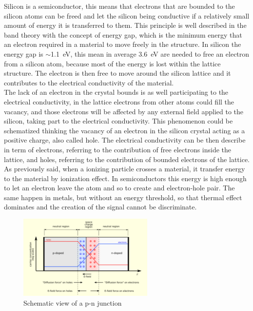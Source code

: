 Silicon is a semiconductor, this means that electrons that are bounded to the silicon atoms can be freed and let the silicon being conductive if a relatively small amount of energy it is transferred to them. This principle is well described in the band theory \cite{band-theory} with the concept of energy gap, which is the minimum energy that an electron required in a material to move freely in the structure. In silicon the energy gap is $\sim$\SI{1.1}{\eV}, this mean in average \SI{3.6}{\eV} are needed to free an electron from a silicon atom, because most of the energy is lost within the lattice structure. The electron is then free to move around the silicon lattice and it contributes to the electrical conductivity of the material.\\
The lack of an electron in the crystal bounds is as well participating to the electrical conductivity, in the lattice electrons from other atoms could fill the vacancy, and those electrons will be affected by any external field applied to the silicon, taking part to the electrical conductivity. This phenomenon could be schematized thinking the vacancy of an electron in the silicon crystal acting as a positive charge, also called hole. The electrical conductivity can  be then describe in term of electrons, referring to the contribution of free electrons inside the lattice, and holes, referring to the contribution of bounded electrons of the lattice.\\
As previously said, when a ionizing particle crosses a material, it transfer energy to the material by ionization effect.
In semiconductors this energy is high enough to let an electron leave the atom and so to create and electron-hole pair. The same happen in metals, but without an energy threshold, so that thermal effect dominates and the creation of the signal cannot be discriminate.\\
\begin{figure}
\center
\includegraphics[width=0.6\textwidth]{Images/tracking_det/pn-junction.png}
\caption{Schematic view of a p-n junction}
\label{pic:pn-junction}
\end{figure}
